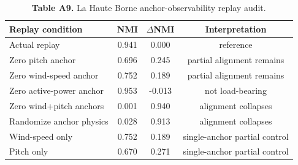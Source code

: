\begin{table}[H]
\centering
\scriptsize
\setlength{\tabcolsep}{4pt}
\renewcommand{\arraystretch}{1.05}
\caption*{\textbf{Table A9.} La Haute Borne anchor-observability replay audit.}
\begin{tabular}{lccc}
\toprule
Replay condition & NMI & $\Delta$NMI & Interpretation \\
\midrule
Actual replay & 0.941 & 0.000 & reference \\
Zero pitch anchor & 0.696 & 0.245 & partial alignment remains \\
Zero wind-speed anchor & 0.752 & 0.189 & partial alignment remains \\
Zero active-power anchor & 0.953 & -0.013 & not load-bearing \\
Zero wind+pitch anchors & 0.001 & 0.940 & alignment collapses \\
Randomize anchor physics & 0.028 & 0.913 & alignment collapses \\
Wind-speed only & 0.752 & 0.189 & single-anchor partial control \\
Pitch only & 0.670 & 0.271 & single-anchor partial control \\
\bottomrule
\end{tabular}
\end{table}
